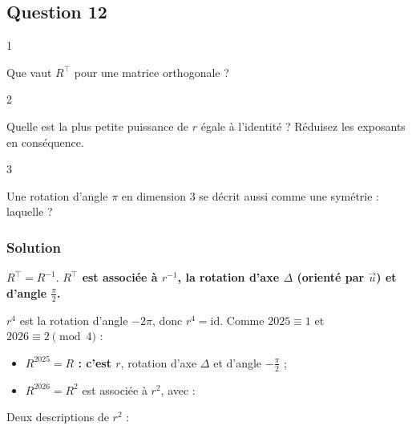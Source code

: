 \documentclass[11pt,a4paper]{article}
\providecommand{\tightlist}{\setlength{\itemsep}{0pt}\setlength{\parskip}{0pt}}
\newcommand{\equationajustee}[1]{%
  \sbox{\boiteequation}{$\displaystyle #1$}%
  \ifdim\wd\boiteequation>\linewidth
    \[\resizebox{\linewidth}{!}{\usebox{\boiteequation}}\]%
  \else
    \[#1\]%
  \fi}
\begin{document}
\hypertarget{question-12}{%
\subsection{Question 12}\label{question-12}}

\begin{indication}{1}

Que vaut \(R^\top\) pour une matrice orthogonale ?

\end{indication}

\begin{indication}{2}

Quelle est la plus petite puissance de \(r\) égale à l'identité ? Réduisez les exposants en conséquence.

\end{indication}

\begin{indication}{3}

Une rotation d'angle \(\pi\) en dimension 3 se décrit aussi comme une symétrie : laquelle ?

\end{indication}

\hypertarget{solution-12}{%
\subsubsection{Solution}\label{solution-12}}

\(R^\top=R^{-1}\). \textbf{\(R^\top\) est associée à \(r^{-1}\), la rotation d'axe \(\Delta\) (orienté par \(\vec u\)) et d'angle \(\frac\pi2\).}

\(r^4\) est la rotation d'angle \(-2\pi\), donc \(r^4=\mathrm{id}\). Comme \(2025\equiv1\) et \(2026\equiv2\pmod 4\) :

\begin{itemize}
\tightlist
\item
  \textbf{\(R^{2025}=R\) : c'est \(r\)}, rotation d'axe \(\Delta\) et d'angle \(-\frac\pi2\) ;
\item
  \(R^{2026}=R^2\) est associée à \(r^2\), avec :
\end{itemize}

\equationajustee{R^2=\begin{pmatrix}-1&0&0\\0&0&-1\\0&-1&0\end{pmatrix}.}

Deux descriptions de \(r^2\) :
\end{document}
